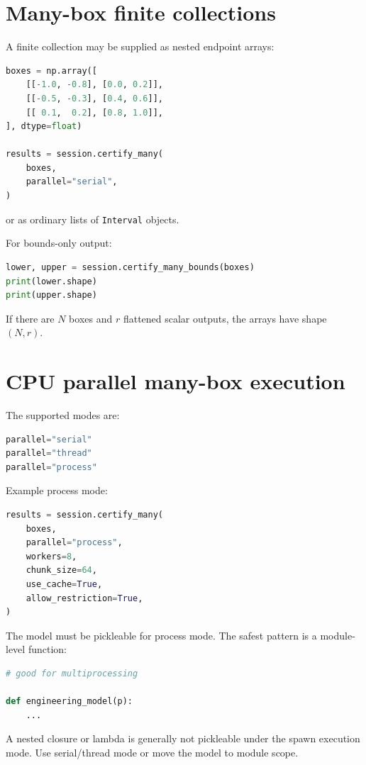 \documentclass[11pt]{article}
\begin{document}
\section{Many-box finite collections}

A finite collection may be supplied as nested endpoint arrays:
\begin{lstlisting}[language=Python]
boxes = np.array([
    [[-1.0, -0.8], [0.0, 0.2]],
    [[-0.5, -0.3], [0.4, 0.6]],
    [[ 0.1,  0.2], [0.8, 1.0]],
], dtype=float)

results = session.certify_many(
    boxes,
    parallel="serial",
)
\end{lstlisting}

or as ordinary lists of \texttt{Interval} objects.

For bounds-only output:
\begin{lstlisting}[language=Python]
lower, upper = session.certify_many_bounds(boxes)
print(lower.shape)
print(upper.shape)
\end{lstlisting}
If there are \(N\) boxes and \(r\) flattened scalar outputs, the arrays have
shape \((N,r)\).

\section{CPU parallel many-box execution}

The supported modes are:
\begin{lstlisting}[language=Python]
parallel="serial"
parallel="thread"
parallel="process"
\end{lstlisting}

Example process mode:
\begin{lstlisting}[language=Python]
results = session.certify_many(
    boxes,
    parallel="process",
    workers=8,
    chunk_size=64,
    use_cache=True,
    allow_restriction=True,
)
\end{lstlisting}

The model must be pickleable for process mode.  The safest pattern is a
module-level function:
\begin{lstlisting}[language=Python]
# good for multiprocessing

def engineering_model(p):
    ...
\end{lstlisting}
A nested closure or lambda is generally not pickleable under the spawn execution
mode.  Use serial/thread mode or move the model to module scope.
\end{document}
